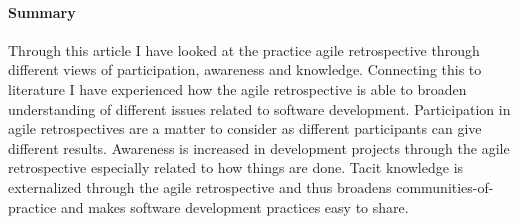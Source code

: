 \documentclass[12pt]{article}
\begin{document}
\paragraph{Summary}
Through this article I have looked at the practice agile retrospective through different views of participation, awareness and knowledge. Connecting this to literature I have experienced how the agile retrospective is able to broaden understanding of different issues related to software development. Participation in agile retrospectives are a matter to consider as different participants can give different results. Awareness is increased in development projects through the agile retrospective especially related to how things are done. Tacit knowledge is externalized through the agile retrospective and thus broadens communities-of-practice and makes software development practices easy to share. 



\end{document}
